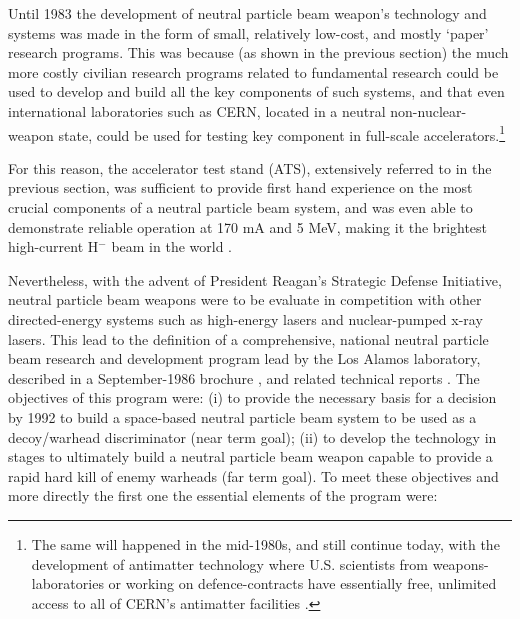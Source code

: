 \documentclass [12pt,a4paper,     ]{report} %
\begin{document}
Until 1983 the development of neutral particle beam weapon's technology and systems was made in the form of small, relatively low-cost, and mostly `paper' research programs.  This was because (as shown in the previous section) the much more costly civilian research programs related to fundamental research could be used to develop and build all the key components of such systems, and that even international laboratories such as CERN, located in a neutral non-nuclear-weapon state, could be used for testing key component in full-scale accelerators.\footnote{The same will happened in the mid-1980s, and still continue today, with the development of antimatter technology where U.S. scientists from weapons-laboratories or working on defence-contracts have essentially free, unlimited access to all of CERN's antimatter facilities \cite{GSPON1987A,GSPON1988-,THEE-1988-}. }

For this reason, the accelerator test stand (ATS), extensively referred to in the previous section, was sufficient to provide first hand experience on the most crucial components of a neutral particle beam system, and was even able to demonstrate reliable operation at 170 mA and 5 MeV, making it the brightest high-current H$^-$ beam in the world \cite[p.3]{BURIC1986-}.





Nevertheless, with the advent of President Reagan's Strategic Defense Initiative, neutral particle beam weapons were to be evaluate in competition with other directed-energy systems such as high-energy lasers and nuclear-pumped x-ray lasers.   This lead to the definition of a comprehensive, national neutral particle beam research and development program lead by the Los Alamos laboratory, described in a September-1986 brochure \cite{BURIC1986-}, and related technical reports \cite{LAGTA1986-}.  The objectives of this program were: (i) to provide the necessary basis for a decision by 1992 to build a space-based neutral particle beam system to be used as a decoy/warhead discriminator (near term goal); (ii) to develop the technology in stages to ultimately build a neutral particle beam weapon capable to provide a rapid hard kill of enemy warheads (far term goal).  To meet these objectives and more directly the first one the essential elements of the program were:
\end{document}
